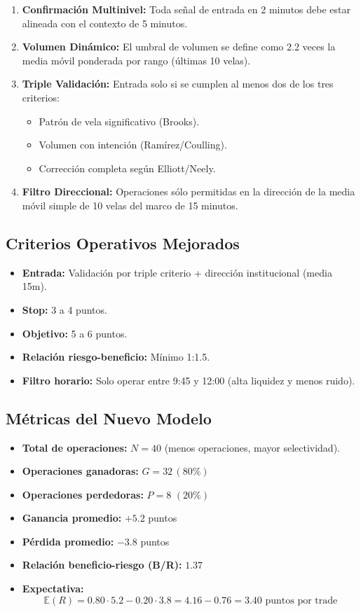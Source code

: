 \begin{enumerate}
    \item \textbf{Confirmaci\'on Multinivel:} Toda se\~nal de entrada en 2 minutos debe estar alineada con el contexto de 5 minutos.
    \item \textbf{Volumen Din\'amico:} El umbral de volumen se define como 2.2 veces la media m\'ovil ponderada por rango (últimas 10 velas).
    \item \textbf{Triple Validaci\'on:} Entrada solo si se cumplen al menos dos de los tres criterios:
    \begin{itemize}
        \item Patr\'on de vela significativo (Brooks).
        \item Volumen con intenci\'on (Ram\'irez/Coulling).
        \item Correcci\'on completa seg\'un Elliott/Neely.
    \end{itemize}
    \item \textbf{Filtro Direccional:} Operaciones s\'olo permitidas en la direcci\'on de la media m\'ovil simple de 10 velas del marco de 15 minutos.
\end{enumerate}

\subsection{Criterios Operativos Mejorados}

\begin{itemize}
    \item \textbf{Entrada:} Validaci\'on por triple criterio + direcci\'on institucional (media 15m).
    \item \textbf{Stop:} 3 a 4 puntos.
    \item \textbf{Objetivo:} 5 a 6 puntos.
    \item \textbf{Relaci\'on riesgo-beneficio:} M\'inimo 1:1.5.
    \item \textbf{Filtro horario:} Solo operar entre 9:45 y 12:00 (alta liquidez y menos ruido).
\end{itemize}

\subsection{M\'etricas del Nuevo Modelo}

\begin{itemize}
    \item \textbf{Total de operaciones:} $N = 40$ (menos operaciones, mayor selectividad).
    \item \textbf{Operaciones ganadoras:} $G = 32 \, (80\%)$
    \item \textbf{Operaciones perdedoras:} $P = 8$ $(20\%)$
    \item \textbf{Ganancia promedio:} $+5.2$ puntos
    \item \textbf{P\'erdida promedio:} $-3.8$ puntos
    \item \textbf{Relaci\'on beneficio-riesgo (B/R):} $1.37$
    \item \textbf{Expectativa:}
    \[
        \mathbb{E}(R) = 0.80 \cdot 5.2 - 0.20 \cdot 3.8 = 4.16 - 0.76 = 3.40 \text{ puntos por trade}
    \]
\end{itemize}

